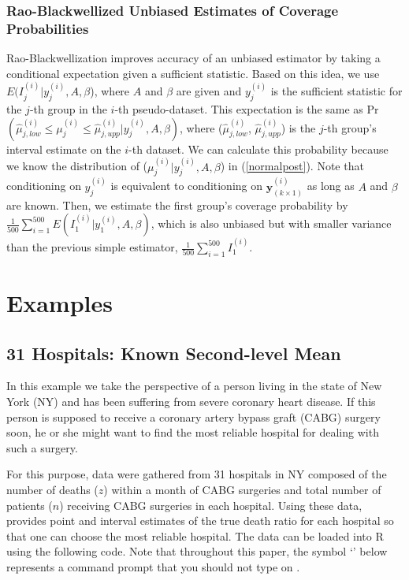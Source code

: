 \documentclass[article]{jss}
\begin{document}
\subsubsection{Rao-Blackwellized Unbiased Estimates of Coverage Probabilities}
Rao-Blackwellization improves accuracy of an unbiased estimator by taking a conditional expectation given a sufficient statistic. Based on this idea, we use $E(I^{(i)}_{j}\vert y^{(i)}_{j}, A, \beta$), where $A$ and $\beta$ are given and $y^{(i)}_{j}$ is the sufficient statistic for the $j$-th group in the $i$-th pseudo-dataset. This expectation is the same as Pr$(\hat{\mu}^{(i)}_{j, low}\le \mu^{(i)}_{j} \le\hat{\mu}^{(i)}_{j, upp}\vert y^{(i)}_{j}, A, \beta)$, where ($\hat{\mu}^{(i)}_{j, low}$, $\hat{\mu}^{(i)}_{j, upp}$) is the $j$-th group's interval estimate on the $i$-th dataset. We can calculate this probability  because we know the distribution of ($\mu^{(i)}_{j} \vert y^{(i)}_{j}, A, \beta$) in (\ref{normalpost}). Note that conditioning on $y^{(i)}_{j}$ is equivalent to conditioning on $\mathbf{y}^{(i)}_{(k\times1)}$ as long as $A$ and $\beta$ are known. Then, we estimate the first group's coverage probability by $\frac{1}{500}\sum_{i=1}^{500}E(I^{(i)}_{1}\vert y^{(i)}_{1}, A, \beta)$, which is also unbiased but with smaller variance than the previous simple estimator, $\frac{1}{500}\sum_{i=1}^{500}I^{(i)}_{1}$.



\section[Examples]{Examples}
\subsection[Known Second-level Mean]{31 Hospitals: Known Second-level Mean}
\label{sec:ex:hosp}
In this example we take the perspective of a person living in the state of New York (NY) and has been suffering from severe coronary heart disease. If this person is supposed to receive a coronary artery bypass graft (CABG) surgery soon, he or she might want to find the most reliable hospital for dealing with such a surgery.

For this purpose, data were gathered from 31 hospitals in NY composed of the number of deaths ($z$) within a month of CABG surgeries and total number of patients ($n$) receiving CABG surgeries in each hospital. Using these data,  provides point and interval estimates of the true death ratio for each hospital so that one can choose the most reliable hospital. The data can be loaded into R using the following code. Note that throughout this paper, the symbol `' below represents a command prompt that you should not type on .
\end{document}

